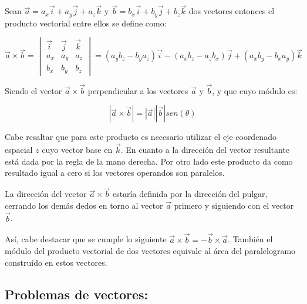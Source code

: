 \documentclass[a5paper,pagesize,10pt,bibtotoc,pointlessnumbers,
normalheadings,DIV=9,fleqn,x11names,table,twoside=false]{scrbook}
\begin{document}
\begin{tcolorbox}
 Sean $\vec{a} =a_x\vec{i}+a_y\vec{j}+a_z\vec{k}$ y $\vec{b}=b_x\vec{i}+b_y\vec{j}+b_z\vec{k}$ dos vectores entonces el 
 producto vectorial entre ellos se define como: 
 
 \[
\vec{a}\times\vec{b} =
\begin{vmatrix}
\vec{i} & \vec{j} & \vec{k} \\ 
a_x & a_y & a_z \\
b_x & b_y & b_z
\end{vmatrix} = (a_yb_z-b_ya_z)\vec{i}-(a_xb_z-a_zb_x)\vec{j}+(a_xb_y-b_xa_y)\vec{k}
\]
\end{tcolorbox}

Siendo el vector $\vec{a}\times\vec{b}$ perpendicular a los vectores $\vec{a}$ y $\vec{b}$, y que cuyo módulo es:

\begin{equation}
 |\vec{a}\times\vec{b}|=|\vec{a}||\vec{b}|sen(\theta)
\end{equation}

Cabe resaltar que para este producto es necesario utilizar el eje coordenado espacial $z$ cuyo vector base en 
$\vec{k}$. En cuanto a la dirección del vector resultante está dada por la regla de la mano derecha. Por otro lado este 
producto da como resultado igual a cero si los vectores operandos son paralelos.

\begin{tcolorbox}
La dirección del vector $\vec{a}\times\vec{b}$ estaría definida por la dirección del pulgar, cerrando los demás dedos en torno al 
vector $\vec{a}$ primero y siguiendo con el vector $\vec{b}$.
\end{tcolorbox}

Así, cabe destacar que se cumple lo siguiente $\vec{a}\times\vec{b}=-\vec{b}\times\vec{a}$. También el módulo del producto 
vectorial de dos vectores equivale al área del paralelogramo construído en estos vectores.

\subsection{Problemas de vectores:}
\end{document}
